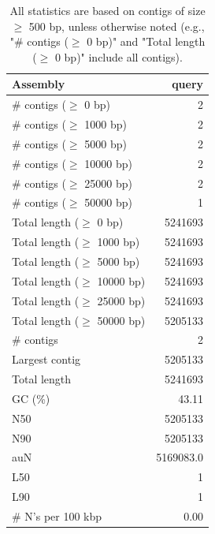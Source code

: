 \documentclass[12pt,a4paper]{article}
\begin{document}
\begin{table}[ht]
\begin{center}
\caption{All statistics are based on contigs of size $\geq$ 500 bp, unless otherwise noted (e.g., "\# contigs ($\geq$ 0 bp)" and "Total length ($\geq$ 0 bp)" include all contigs).}
\begin{tabular}{|l*{1}{|r}|}
\hline
Assembly & query \\ \hline
\# contigs ($\geq$ 0 bp) & 2 \\ \hline
\# contigs ($\geq$ 1000 bp) & 2 \\ \hline
\# contigs ($\geq$ 5000 bp) & 2 \\ \hline
\# contigs ($\geq$ 10000 bp) & 2 \\ \hline
\# contigs ($\geq$ 25000 bp) & 2 \\ \hline
\# contigs ($\geq$ 50000 bp) & 1 \\ \hline
Total length ($\geq$ 0 bp) & 5241693 \\ \hline
Total length ($\geq$ 1000 bp) & 5241693 \\ \hline
Total length ($\geq$ 5000 bp) & 5241693 \\ \hline
Total length ($\geq$ 10000 bp) & 5241693 \\ \hline
Total length ($\geq$ 25000 bp) & 5241693 \\ \hline
Total length ($\geq$ 50000 bp) & 5205133 \\ \hline
\# contigs & 2 \\ \hline
Largest contig & 5205133 \\ \hline
Total length & 5241693 \\ \hline
GC (\%) & 43.11 \\ \hline
N50 & 5205133 \\ \hline
N90 & 5205133 \\ \hline
auN & 5169083.0 \\ \hline
L50 & 1 \\ \hline
L90 & 1 \\ \hline
\# N's per 100 kbp & 0.00 \\ \hline
\end{tabular}
\end{center}
\end{table}
\end{document}
